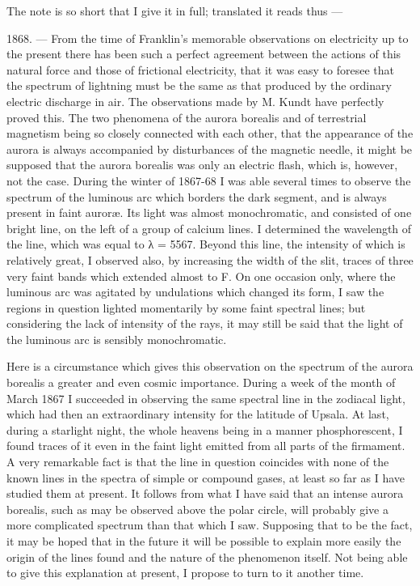 \documentclass[a4paper, 12pt, oneside, polutonikogreek, english]{article}
\begin{document}
The note is so short that I give it in full; translated it reads thus ---

1868. --- From the time of Franklin's memorable observations on electricity up to the present there has been such a perfect agreement between the actions of this natural force and those of frictional electricity, that it was easy to foresee that the spectrum of lightning must be the same as that produced by the ordinary electric discharge in air. The observations made by M. Kundt have perfectly proved this. The two phenomena of the aurora borealis and of terrestrial magnetism being so closely connected with each other, that the appearance of the aurora is always accompanied by disturbances of the magnetic needle, it might be supposed that the aurora borealis was only an electric flash, which is, however, not the case. During the winter of 1867-68 I was able several times to observe the spectrum of the luminous arc which borders the dark segment, and is always present in faint auroræ. Its light was almost monochromatic, and consisted of one bright line, on the left of a group of calcium lines. I determined the wavelength of the line, which was equal to λ = 5567. Beyond this line, the intensity of which is relatively great, I observed also, by increasing the width of the slit, traces of three very faint bands which extended almost to F. On one occasion only, where the luminous arc was agitated by undulations which changed its form, I saw the regions in question lighted momentarily by some faint spectral lines; but considering the lack of intensity of the rays, it may still be said that the light of the luminous arc is sensibly monochromatic.

Here is a circumstance which gives this observation on the spectrum of the aurora borealis a greater and even cosmic importance. During a week of the month of March 1867 I succeeded in observing the same spectral line in the zodiacal light, which had then an extraordinary intensity for the latitude of Upsala. At last, during a starlight night, the whole heavens being in a manner phosphorescent, I found traces of it even in the faint light emitted from all parts of the firmament. A very remarkable fact is that the line in question coincides with none of the known lines in the spectra of simple or compound gases, at least so far as I have studied them at present. It follows from what I have said that an intense aurora borealis, such as may be observed above the polar circle, will probably give a more complicated spectrum than that which I saw. Supposing that to be the fact, it may be hoped that in the future it will be possible to explain more easily the origin of the lines found and the nature of the phenomenon itself. Not being able to give this explanation at present, I propose to turn to it another time.
\end{document}
